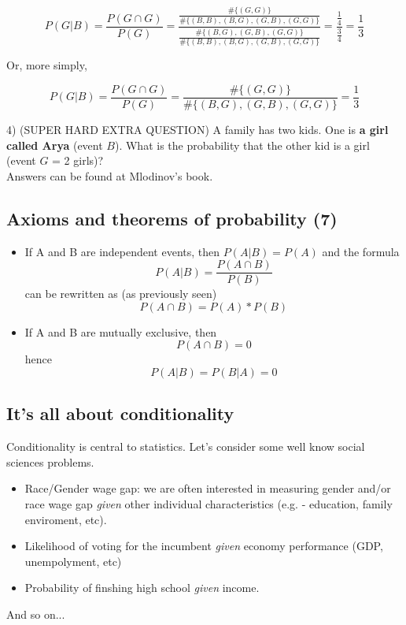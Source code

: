 \documentclass[11pt]{article}
\begin{document}
	\[P(G|B) = \frac{P(G\cap G)}{P(G)} = \frac{\frac{\#\{(G,G)\}}{\#\{(B,B), (B,G), (G,B), (G,G)\}}}
							{\frac{\#\{(B,G), (G,B), (G,G)\}}{\#\{(B,B), (B,G), (G,B), (G,G)\}}} = 
							\frac{\frac{1}{4}}{\frac{3}{4}} = \frac{1}{3} \]

	Or, more simply, 
	
	\[P(G|B) = \frac{P(G\cap G)}{P(G)} = \frac{\#\{(G,G)\}}{\#\{(B,G), (G,B), (G,G)\}} = \frac{1}{3}\]

	4) (SUPER HARD EXTRA QUESTION) A family has two kids. One is \textbf{a girl called Arya} (event $B$). What is the probability that the other kid is a girl (event $G$ = 2 girls)?\\

	Answers can be found at Mlodinov's book.

	\subsection*{Axioms and theorems of probability (7)}
	\begin{itemize}
		\item If A and B are independent events, then $P(A|B) = P(A)$ and the formula
	\[P(A|B) = \frac{P(A\cap B)}{P(B)}\]
	can be rewritten as (as previously seen)
	\[P(A\cap B) = P(A)*P(B)\]
			\item If A and B are mutually exclusive, then
		\[P(A\cap B) = 0\]
			hence
		 \[P(A|B) = P(B|A) = 0\] 
	\end{itemize}


	\subsection*{It's all about conditionality}

 	Conditionality is central to statistics. Let's consider some well know social sciences problems.

	\begin{itemize}
		\item	Race/Gender wage gap: we are often interested in measuring gender and/or race wage gap \emph{given} other individual characteristics (e.g. - education, family enviroment, etc).
		\item Likelihood of voting for the incumbent \emph{given} economy performance (GDP, unempolyment, etc)
		\item Probability of finshing high school \emph{given} income.
		\end{itemize}
		 And so on...
\end{document}
